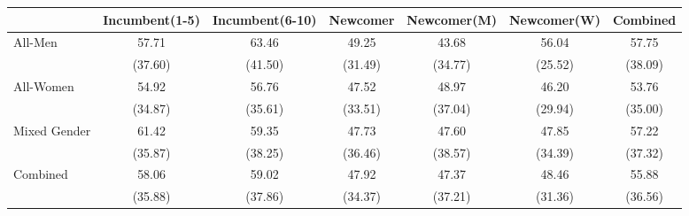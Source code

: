\begin{tabular}{l*{6}{c}}
\toprule
                & Incumbent(1-5) &Incumbent(6-10) & Newcomer & Newcomer(M) & Newcomer(W) &    Combined \\
\midrule
All-Men      & 57.71& 63.46& 49.25  &    43.68&    56.04&    57.75\\
                &(37.60)&(41.50)&(31.49)&  (34.77)&  (25.52)&  (38.09)\\
\addlinespace
All-Women&   54.92&   56.76&   47.52 &    48.97&    46.20&    53.76\\
                & (34.87)& (35.61)& (33.51)&  (37.04)&  (29.94)&  (35.00)\\
\addlinespace
Mixed Gender     &    61.42&    59.35&    47.73&    47.60&    47.85&    57.22\\
                &   (35.87)&   (38.25)&   (36.46)&  (38.57)&  (34.39)&  (37.32)\\
\addlinespace
Combined &    58.06&    59.02  &  47.92&    47.37&    48.46&    55.88\\
                &  (35.88)&  (37.86)&  (34.37)&  (37.21)&  (31.36)&  (36.56)\\

\bottomrule
\end{tabular}
